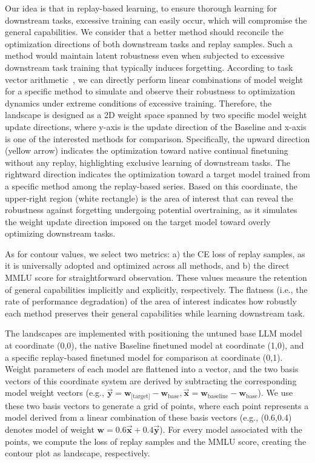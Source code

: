 Our idea is that in replay-based learning, to ensure thorough learning for downstream tasks, excessive training can easily occur, which will compromise the general capabilities.
We consider that a better method should reconcile the optimization directions of both downstream tasks and replay samples. Such a method would maintain latent robustness even when subjected to excessive downstream task training that typically induces forgetting.
According to task vector arithmetic~\cite{ilharco2023editing}, we can directly perform linear combinations of model weight for a specific method to simulate and observe their robustness to optimization dynamics under extreme conditions of excessive training. 
Therefore, the landscape is designed as a 2D weight space spanned by two specific model weight update directions, where y-axis is the update direction of the Baseline and x-axis is one of the interested methods for comparison.
Specifically, the upward direction (yellow arrow) indicates the optimization toward native continual finetuning without any replay, highlighting exclusive learning of downstream tasks.
The rightward direction indicates the optimization toward a target model trained from a specific method among the replay-based series.
Based on this coordinate, the upper-right region (white rectangle) is the area of interest that can reveal the robustness against forgetting undergoing potential overtraining, as it simulates the weight update direction imposed on the target model toward overly optimizing downstream tasks.

As for contour values, we select two metrics: a) the CE loss of replay samples, as it is universally adopted and optimized across all methods, and b) the direct MMLU score for straightforward observation. These values measure the retention of general capabilities implicitly and explicitly, respectively. The flatness (i.e., the rate of performance degradation) of the area of interest indicates how robustly each method preserves their general capabilities while learning downstream task.

The landscapes are implemented with positioning the untuned base LLM model at coordinate (0,0), the native Baseline finetuned model at coordinate (1,0), and a specific replay-based finetuned model for comparison at coordinate (0,1).
Weight parameters of each model are flattened into a vector, and the two basis vectors of this coordinate system are derived by subtracting the corresponding model weight vectors
(e.g., $\vec{\mathbf{y}}{=}\mathbf{w}_{\text{[target]}}{-}\mathbf{w}_{\text{base}}, \vec{\mathbf{x}}{=}\mathbf{w}_{\text{baseline}}{-}\mathbf{w}_{\text{base}}$).
We use these two basis vectors to generate a grid of points, where each point represents a model derived from a linear combination of these basis vectors
(e.g., (0.6,0.4) denotes model of weight $\mathbf{w}{=}0.6\vec{\mathbf{x}}{+}0.4\vec{\mathbf{y}}$).
For every model associated with the points, we compute the loss of replay samples and the MMLU score, creating the contour plot as landscape, respectively.

